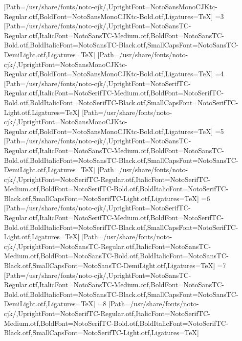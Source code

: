 [Path=/usr/share/fonts/noto-cjk/,UprightFont=NotoSansMonoCJKtc-Regular.otf,BoldFont=NotoSansMonoCJKtc-Bold.otf,Ligatures=TeX]
\else\ifnum\value{CJKFonts}=3
[Path=/usr/share/fonts/noto-cjk/,UprightFont=NotoSansTC-Regular.otf,ItalicFont=NotoSansTC-Medium.otf,BoldFont=NotoSansTC-Bold.otf,BoldItalicFont=NotoSansTC-Black.otf,SmallCapsFont=NotoSansTC-DemiLight.otf,Ligatures=TeX]
[Path=/usr/share/fonts/noto-cjk/,UprightFont=NotoSansMonoCJKtc-Regular.otf,BoldFont=NotoSansMonoCJKtc-Bold.otf,Ligatures=TeX]
\else\ifnum\value{CJKFonts}=4
[Path=/usr/share/fonts/noto-cjk/,UprightFont=NotoSerifTC-Regular.otf,ItalicFont=NotoSerifTC-Medium.otf,BoldFont=NotoSerifTC-Bold.otf,BoldItalicFont=NotoSerifTC-Black.otf,SmallCapsFont=NotoSerifTC-Light.otf,Ligatures=TeX]
[Path=/usr/share/fonts/noto-cjk/,UprightFont=NotoSansMonoCJKtc-Regular.otf,BoldFont=NotoSansMonoCJKtc-Bold.otf,Ligatures=TeX]
\else\ifnum\value{CJKFonts}=5
[Path=/usr/share/fonts/noto-cjk/,UprightFont=NotoSansTC-Regular.otf,ItalicFont=NotoSansTC-Medium.otf,BoldFont=NotoSansTC-Bold.otf,BoldItalicFont=NotoSansTC-Black.otf,SmallCapsFont=NotoSansTC-DemiLight.otf,Ligatures=TeX]
[Path=/usr/share/fonts/noto-cjk/,UprightFont=NotoSerifTC-Regular.otf,ItalicFont=NotoSerifTC-Medium.otf,BoldFont=NotoSerifTC-Bold.otf,BoldItalicFont=NotoSerifTC-Black.otf,SmallCapsFont=NotoSerifTC-Light.otf,Ligatures=TeX]
\else\ifnum\value{CJKFonts}=6
[Path=/usr/share/fonts/noto-cjk/,UprightFont=NotoSerifTC-Regular.otf,ItalicFont=NotoSerifTC-Medium.otf,BoldFont=NotoSerifTC-Bold.otf,BoldItalicFont=NotoSerifTC-Black.otf,SmallCapsFont=NotoSerifTC-Light.otf,Ligatures=TeX]
[Path=/usr/share/fonts/noto-cjk/,UprightFont=NotoSansTC-Regular.otf,ItalicFont=NotoSansTC-Medium.otf,BoldFont=NotoSansTC-Bold.otf,BoldItalicFont=NotoSansTC-Black.otf,SmallCapsFont=NotoSansTC-DemiLight.otf,Ligatures=TeX]
\else\ifnum\value{CJKFonts}=7
[Path=/usr/share/fonts/noto-cjk/,UprightFont=NotoSansTC-Regular.otf,ItalicFont=NotoSansTC-Medium.otf,BoldFont=NotoSansTC-Bold.otf,BoldItalicFont=NotoSansTC-Black.otf,SmallCapsFont=NotoSansTC-DemiLight.otf,Ligatures=TeX]
\else\ifnum\value{CJKFonts}=8
[Path=/usr/share/fonts/noto-cjk/,UprightFont=NotoSerifTC-Regular.otf,ItalicFont=NotoSerifTC-Medium.otf,BoldFont=NotoSerifTC-Bold.otf,BoldItalicFont=NotoSerifTC-Black.otf,SmallCapsFont=NotoSerifTC-Light.otf,Ligatures=TeX]
